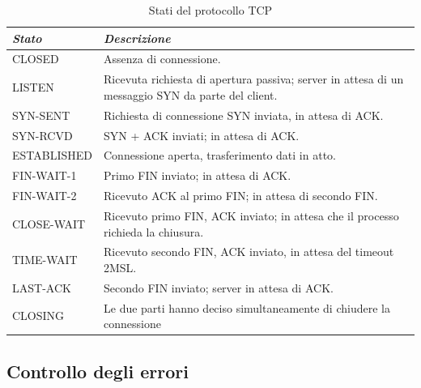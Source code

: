 \begin{table}[H]
    \centering
    \begin{tabular}{|l|m{22em}|}
        \hline
        \emph{Stato} & \emph{Descrizione}                                                                                \\
        \hline
        CLOSED       & Assenza di connessione.                                                                           \\
        \hline
        LISTEN       & Ricevuta richiesta di apertura passiva; server in attesa di un messaggio SYN da parte del client. \\
        \hline
        SYN-SENT     & Richiesta di connessione SYN inviata, in attesa di ACK.                                           \\
        \hline
        SYN-RCVD     & SYN + ACK inviati; in attesa di ACK.                                                              \\
        \hline
        ESTABLISHED  & Connessione aperta, trasferimento dati in atto.                                                   \\
        \hline
        FIN-WAIT-1   & Primo FIN inviato; in attesa di ACK.                                                              \\
        \hline
        FIN-WAIT-2   & Ricevuto ACK al primo FIN; in attesa di secondo FIN.                                              \\
        \hline
        CLOSE-WAIT   & Ricevuto primo FIN, ACK inviato; in attesa che il processo richieda la chiusura.                  \\
        \hline
        TIME-WAIT    & Ricevuto secondo FIN, ACK inviato, in attesa del timeout 2MSL.                                    \\
        \hline
        LAST-ACK     & Secondo FIN inviato; server in attesa di ACK.                                                     \\
        \hline
        CLOSING      & Le due parti hanno deciso simultaneamente di chiudere la connessione                              \\
        \hline
    \end{tabular}
    \caption*{Stati del protocollo TCP}

\end{table}

\subsection{Controllo degli errori}

